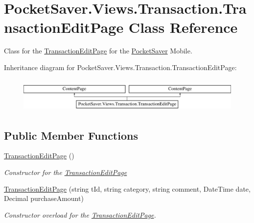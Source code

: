 \hypertarget{class_pocket_saver_1_1_views_1_1_transaction_1_1_transaction_edit_page}{}\section{Pocket\+Saver.\+Views.\+Transaction.\+Transaction\+Edit\+Page Class Reference}
\label{class_pocket_saver_1_1_views_1_1_transaction_1_1_transaction_edit_page}


Class for the \hyperlink{class_pocket_saver_1_1_views_1_1_transaction_1_1_transaction_edit_page}{Transaction\+Edit\+Page} for the \hyperlink{namespace_pocket_saver}{Pocket\+Saver} Mobile.  


Inheritance diagram for Pocket\+Saver.\+Views.\+Transaction.\+Transaction\+Edit\+Page\+:\begin{figure}[H]
\begin{center}
\leavevmode
\includegraphics[height=1.750000cm]{class_pocket_saver_1_1_views_1_1_transaction_1_1_transaction_edit_page}
\end{center}
\end{figure}
\subsection*{Public Member Functions}
\begin{DoxyCompactItemize}
\item 
\hyperlink{class_pocket_saver_1_1_views_1_1_transaction_1_1_transaction_edit_page_a6e4aa411cc567c67418fdc425e574551}{Transaction\+Edit\+Page} ()
\begin{DoxyCompactList}\small\item\em Constructor for the \hyperlink{class_pocket_saver_1_1_views_1_1_transaction_1_1_transaction_edit_page}{Transaction\+Edit\+Page} \end{DoxyCompactList}\item 
\hyperlink{class_pocket_saver_1_1_views_1_1_transaction_1_1_transaction_edit_page_a919496a1e0b09b26162d89918b2fe9f6}{Transaction\+Edit\+Page} (string t\+Id, string category, string comment, Date\+Time date, Decimal purchase\+Amount)
\begin{DoxyCompactList}\small\item\em Constructor overload for the \hyperlink{class_pocket_saver_1_1_views_1_1_transaction_1_1_transaction_edit_page}{Transaction\+Edit\+Page}. \end{DoxyCompactList}\end{DoxyCompactItemize}


